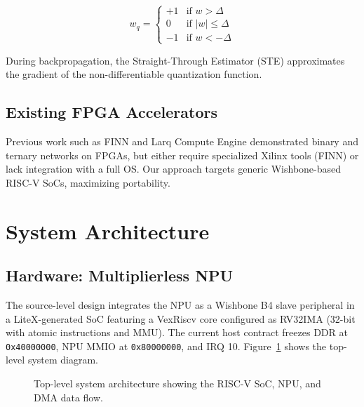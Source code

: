 \documentclass[10pt,conference]{IEEEtran}
\begin{document}
\begin{equation}
w_q = \begin{cases}
+1 & \text{if } w > \Delta \\
0  & \text{if } |w| \leq \Delta \\
-1 & \text{if } w < -\Delta
\end{cases}
\end{equation}

During backpropagation, the Straight-Through Estimator (STE) \cite{binaryconnect} approximates the gradient of the non-differentiable quantization function.

\subsection{Existing FPGA Accelerators}
Previous work such as FINN \cite{finn} and Larq Compute Engine \cite{larq} demonstrated binary and ternary networks on FPGAs, but either require specialized Xilinx tools (FINN) or lack integration with a full OS. Our approach targets generic Wishbone-based RISC-V SoCs, maximizing portability.

\section{System Architecture}
\label{sec:arch}


\subsection{Hardware: Multiplierless NPU}
\label{sec:hardware}

The source-level design integrates the NPU as a Wishbone B4 slave peripheral in a LiteX-generated SoC featuring a VexRiscv core configured as RV32IMA (32-bit with atomic instructions and MMU). The current host contract freezes DDR at \texttt{0x40000000}, NPU MMIO at \texttt{0x80000000}, and IRQ 10. Figure~\ref{fig:arch} shows the top-level system diagram.

\begin{figure}[htbp]
\centering
\vspace{3cm}
\caption{Top-level system architecture showing the RISC-V SoC, NPU, and DMA data flow.}\label{fig:arch}
\end{figure}
\end{document}
